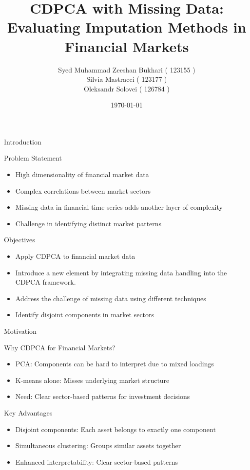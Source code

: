 \documentclass{beamer}
\title{CDPCA with Missing Data: Evaluating Imputation Methods in Financial Markets}
\author[123155/123177/126784]{Syed Muhammad Zeeshan Bukhari ( 123155 )\\
Silvia Mastracci ( 123177 )\\
Oleksandr Solovei ( 126784 )
}
\date{\today}
\begin{document}
\begin{frame}
    \titlepage
\end{frame}

\begin{frame}{Introduction}
    \begin{block}{Problem Statement}
        \begin{itemize}
            \item High dimensionality of financial market data
            \item Complex correlations between market sectors
            \item Missing data in financial time series adds another layer of complexity
            \item Challenge in identifying distinct market patterns
        \end{itemize}
    \end{block}

    \begin{block}{Objectives}
        \begin{itemize}
            \item Apply CDPCA to financial market data
            \item Introduce a new element by integrating missing data handling into the CDPCA framework.
            \item Address the challenge of missing data using different techniques
            \item Identify disjoint components in market sectors
        \end{itemize}
    \end{block}
\end{frame}

\begin{frame}{Motivation}
    \begin{block}{Why CDPCA for Financial Markets?}
        \begin{itemize}
            \item PCA: Components can be hard to interpret due to mixed loadings
            \item K-means alone: Misses underlying market structure
            \item Need: Clear sector-based patterns for investment decisions
        \end{itemize}
    \end{block}

    \begin{block}{Key Advantages}
        \begin{itemize}
            \item Disjoint components: Each asset belongs to exactly one component
            \item Simultaneous clustering: Groups similar assets together
            \item Enhanced interpretability: Clear sector-based patterns
        \end{itemize}
    \end{block}
\end{frame}
\end{document}
